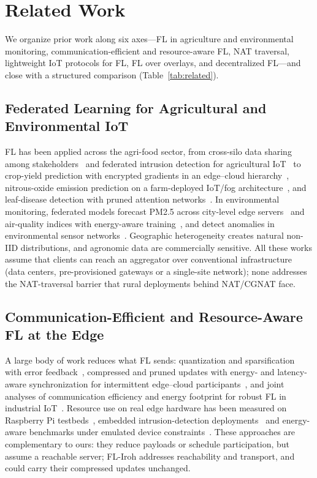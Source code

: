 \section{Related Work}
\label{sec:related}

We organize prior work along six axes---FL in agriculture and environmental monitoring, communication-efficient and resource-aware FL, NAT traversal, lightweight IoT protocols for FL, FL over overlays, and decentralized FL---and close with a structured comparison (Table~\ref{tab:related}).

\subsection{Federated Learning for Agricultural and Environmental IoT}

FL has been applied across the agri-food sector, from cross-silo data sharing among stakeholders~\cite{durrant2022} and federated intrusion detection for agricultural IoT~\cite{friha2022} to crop-yield prediction with encrypted gradients in an edge--cloud hierarchy~\cite{dey2025}, nitrous-oxide emission prediction on a farm-deployed IoT/fog architecture~\cite{killeen2025}, and leaf-disease detection with pruned attention networks~\cite{piccialli2025}. In environmental monitoring, federated models forecast PM2.5 across city-level edge servers~\cite{hu2024} and air-quality indices with energy-aware training~\cite{dey2026}, and detect anomalies in environmental sensor networks~\cite{yan2024}. Geographic heterogeneity creates natural non-IID distributions, and agronomic data are commercially sensitive. All these works assume that clients can reach an aggregator over conventional infrastructure (data centers, pre-provisioned gateways or a single-site network); none addresses the NAT-traversal barrier that rural deployments behind NAT/CGNAT face.

\subsection{Communication-Efficient and Resource-Aware FL at the Edge}

A large body of work reduces what FL sends: quantization and sparsification with error feedback~\cite{konecny2016,malik2026}, compressed and pruned updates with energy- and latency-aware synchronization for intermittent edge--cloud participants~\cite{bayraktar2026}, and joint analyses of communication efficiency and energy footprint for robust FL in industrial IoT~\cite{barbieri2025}. Resource use on real edge hardware has been measured on Raspberry Pi testbeds~\cite{ridolfi2023}, embedded intrusion-detection deployments~\cite{bhavsar2024} and energy-aware benchmarks under emulated device constraints~\cite{miller2026}. These approaches are complementary to ours: they reduce payloads or schedule participation, but assume a reachable server; FL-Iroh addresses reachability and transport, and could carry their compressed updates unchanged.

